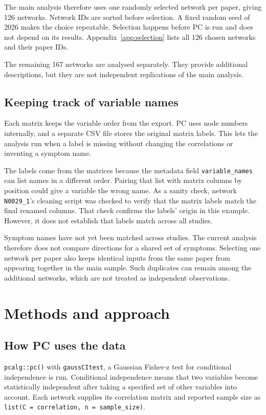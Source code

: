 \documentclass[11pt,a4paper]{article}
\begin{document}
The main analysis therefore uses one randomly selected network per paper, giving 126 networks. Network IDs are sorted before selection. A fixed random seed of 2026 makes the choice repeatable. Selection happens before PC is run and does not depend on its results. Appendix~\ref{app:selection} lists all 126 chosen networks and their paper IDs.

The remaining 167 networks are analysed separately. They provide additional descriptions, but they are not independent replications of the main analysis.

\subsection{Keeping track of variable names}
Each matrix keeps the variable order from the export. PC uses node numbers internally, and a separate CSV file stores the original matrix labels. This lets the analysis run when a label is missing without changing the correlations or inventing a symptom name.

The labels come from the matrices because the metadata field \texttt{variable\_names} can list names in a different order. Pairing that list with matrix columns by position could give a variable the wrong name. As a sanity check, network \texttt{N0029\_1}'s cleaning script was checked to verify that the matrix labels match the final renamed columns. That check confirms the labels' origin in this example. However, it does not establish that labels match across all studies.

Symptom names have not yet been matched across studies. The current analysis therefore does not compare directions for a shared set of symptoms. Selecting one network per paper also keeps identical inputs from the same paper from appearing together in the main sample. Such duplicates can remain among the additional networks, which are not treated as independent observations.

\section{Methods and approach}
\subsection{How PC uses the data}\label{sec:pc-method}
\texttt{pcalg::pc()} with \texttt{gaussCItest}, a Gaussian Fisher-z test for conditional independence \citep{kalisch2012} is run. Conditional independence means that two variables become statistically independent after taking a specified set of other variables into account. Each network supplies its correlation matrix and reported sample size as \texttt{list(C = correlation, n = sample\_size)}.
\end{document}
